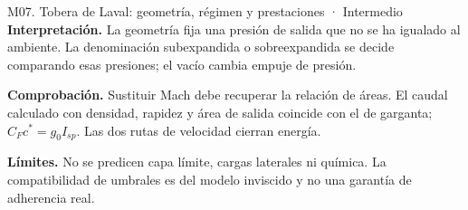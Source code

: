 \begin{studiumworked}{M07. Tobera de Laval: geometría, régimen y prestaciones · Intermedio}
\textbf{Interpretación.} La geometría fija una presión de salida que no se ha igualado al ambiente. La denominación subexpandida o sobreexpandida se decide comparando esas presiones; el vacío cambia empuje de presión.

\textbf{Comprobación.} Sustituir Mach debe recuperar la relación de áreas. El caudal calculado con densidad, rapidez y área de salida coincide con el de garganta; $C_Fc^*=g_0I_{sp}$. Las dos rutas de velocidad cierran energía.

\textbf{Límites.} No se predicen capa límite, cargas laterales ni química. La compatibilidad de umbrales es del modelo inviscido y no una garantía de adherencia real.
\end{studiumworked}

